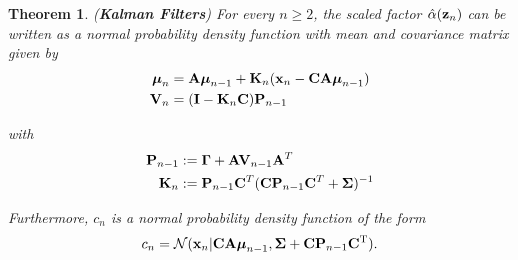 \documentclass[11pt]{article}
\numberwithin{equation}{section}
\newcommand{\x}{{\bf x}}
\newcommand{\z}{{\bf z}}
\newtheorem{theorem}{Theorem}[section]
\begin{document}
\begin{theorem} \label{thorem:alpha-forward-equations-n}
	(\textbf{Kalman Filters}) For every $n \geq 2$, the scaled factor $\hat\alpha(\z_n)$ can be written as a normal probability density function with mean and covariance matrix given by
	\begin{align}
		\boldsymbol{\mu}_n &= {\bf A}\boldsymbol{\mu}_{n-1} + {\bf K}_n(\x_n -{\bf C}{\bf A}\boldsymbol\mu_{n-1})\\
		{\bf V}_n &=  ({\bf I} - {\bf K}_n{\bf C}){\bf P}_{n-1}
	\end{align}
	
	with
	\begin{align}
		{\bf P}_{n-1} &:= \boldsymbol{\Gamma} + {\bf A}{\bf V}_{n-1}{\bf A}^T\\
		{\bf K}_n &:= {\bf P}_{n-1}{\bf C}^T({\bf C} {\bf P}_{n-1}{\bf C}^T + \boldsymbol\Sigma)^{-1}
	\end{align}
	
	Furthermore, $c_n$ is a normal probability density function of the form
	\begin{equation}
		c_n = \mathcal{N}(\x_n \vert {\bf CA}\boldsymbol\mu_{n-1}, \boldsymbol\Sigma + {\bf C P}_{n-1}{\bf C}^\text{T}).
	\end{equation}
\end{theorem}
\end{document}
